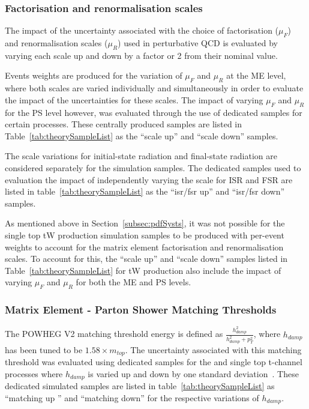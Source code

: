 \subsubsection{Factorisation and renormalisation scales}
The impact of the uncertainty associated with the choice of factorisation ($\mu_{F}$) and renormalisation scales ($\mu_{R}$) used in perturbative QCD is evaluated by varying each scale up and down by a factor or 2 from their nominal value.

Events weights are produced for the variation of $\mu_{F}$ and $\mu_{R}$ at the ME level, where both scales are varied individually and simultaneously in order to evaluate the impact of the uncertainties for these scales.
The impact of varying $\mu_{F}$ and $\mu_{R}$ for the PS level however, was evaluated through the use of dedicated samples for certain processes.
These centrally produced samples are listed in Table~\ref{tab:theorySampleList} as the ``scale up'' and ``scale down'' samples. 

The scale variations for initial-state radiation and final-state radiation are considered separately for the \ttbar simulation samples.
The dedicated \ttbar samples used to evaluation the impact of independently varying the scale for ISR and FSR are listed in table~\ref{tab:theorySampleList} as the ``isr/fsr up'' and ``isr/fsr down'' samples.

As mentioned above in Section~\ref{subsec:pdfSysts}, it was not possible for the single top tW production simulation samples to be produced with per-event weights to account for the matrix element factorisation and renormalisation scales.
To account for this, the ``scale up'' and ``scale down'' samples listed in Table~\ref{tab:theorySampleList} for tW production also include the impact of varying $\mu_{F}$ and $\mu_{R}$ for both the ME and PS levels.

\subsubsection{Matrix Element - Parton Shower Matching Thresholds}
The POWHEG V2 matching threshold energy is defined as $\frac{h_{damp}^{2}}{h_{damp}^{2}+p_{T}^{2}}$, where $h_{damp}$ has been tuned to be $1.58 \times m_{top}$.
The uncertainty associated with this matching threshold was evaluated using dedicated samples for the \ttbar and single top t-channel processes where $h_{damp}$ is varied up and down by one standard deviation~\cite{CMS:2016kle}.
These dedicated simulated samples are listed in table~\ref{tab:theorySampleList} as ``matching up '' and ``matching down'' for the respective variations of $h_{damp}$.

